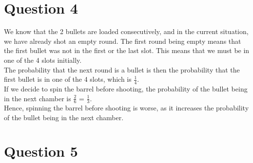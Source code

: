 \documentclass[a4paper]{article}
\begin{document}
\newpage

\section*{Question 4}

We know that the 2 bullets are loaded consecutively, and in the current situation, we have already shot an empty round. The first round being empty means that the first bullet was not in the first or the last slot. This means that we must be in one of the 4 slots initially. \\

The probability that the next round is a bullet is then the probability that the first bullet is in one of the 4 slots, which is $\frac{1}{4}$. \\

If we decide to spin the barrel before shooting, the probability of the bullet being in the next chamber is $\frac{2}{6}$ = $\frac{1}{3}$. \\

Hence, spinning the barrel before shooting is worse, as it increases the probability of the bullet being in the next chamber.


\vspace{10mm}

\section*{Question 5}
\end{document}
